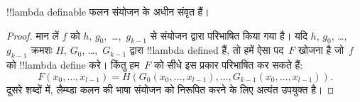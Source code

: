 \documentclass[../../../include/open-logic-section]{subfiles}
\begin{document}

\begin{lem}
!!{lambda definable} फलन संयोजन के अधीन संवृत हैं।
\end{lem}

\begin{proof}
मान लें $f$ को $h$, $g_0,$ \dots,~$g_{k-1}$ से संयोजन द्वारा परिभाषित किया
गया है। यदि $h$, $g_0$, \dots,~$g_{k-1}$ क्रमशः $H$, $G_0$,
\dots,~$G_{k-1}$ द्वारा !!{lambda defined} हैं, तो हमें ऐसा पद~$F$ खोजना है
जो~$f$ को !!{lambda define} करे। किंतु हम~$F$ को सीधे इस प्रकार परिभाषित
कर सकते हैं:
\[
F(x_0, \dots, x_{l-1}) = H(G_0(x_0, \dots, x_{l-1}),
\dots, G_{k-1}(x_0, \dots, x_{l-1})).
\]
दूसरे शब्दों में, लैम्ब्डा कलन की भाषा संयोजन को निरूपित करने के लिए अत्यंत
उपयुक्त है।
\end{proof}
\end{document}
